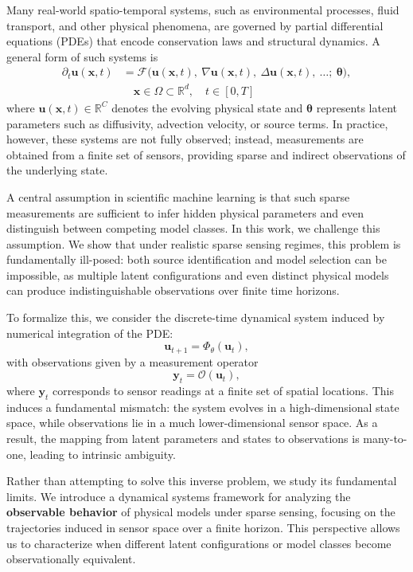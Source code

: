 Many real-world spatio-temporal systems, such as environmental processes, fluid transport, and other physical phenomena, are governed by partial differential equations (PDEs) that encode conservation laws and structural dynamics. A general form of such systems is 
\begin{align}
\partial_t \mathbf{u}(\mathbf{x}, t) 
&= \mathcal{F}\big(
    \mathbf{u}(\mathbf{x}, t),\ 
    \nabla \mathbf{u}(\mathbf{x}, t),\ 
    \Delta \mathbf{u}(\mathbf{x}, t),\ 
    \ldots;\ 
    \boldsymbol{\theta} 
\big), \nonumber \\
&\quad \mathbf{x} \in \Omega \subset \mathbb{R}^d,\quad t \in [0, T]
\end{align}
where \( \mathbf{u}(\mathbf{x}, t) \in \mathbb{R}^C \) denotes the evolving physical state and \( \boldsymbol{\theta} \) represents latent parameters such as diffusivity, advection velocity, or source terms. In practice, however, these systems are not fully observed; instead, measurements are obtained from a finite set of sensors, providing sparse and indirect observations of the underlying state.

A central assumption in scientific machine learning is that such sparse measurements are sufficient to infer hidden physical parameters and even distinguish between competing model classes. In this work, we challenge this assumption. We show that under realistic sparse sensing regimes, this problem is fundamentally ill-posed: both source identification and model selection can be impossible, as multiple latent configurations and even distinct physical models can produce indistinguishable observations over finite time horizons.

To formalize this, we consider the discrete-time dynamical system induced by numerical integration of the PDE:
\[
\mathbf{u}_{t+1} = \Phi_\theta(\mathbf{u}_t),
\]
with observations given by a measurement operator
\[
\mathbf{y}_t = \mathcal{O}(\mathbf{u}_t),
\]
where $\mathbf{y}_t$ corresponds to sensor readings at a finite set of spatial locations. This induces a fundamental mismatch: the system evolves in a high-dimensional state space, while observations lie in a much lower-dimensional sensor space. As a result, the mapping from latent parameters and states to observations is many-to-one, leading to intrinsic ambiguity.

Rather than attempting to solve this inverse problem, we study its fundamental limits. We introduce a dynamical systems framework for analyzing the \textbf{observable behavior} of physical models under sparse sensing, focusing on the trajectories induced in sensor space over a finite horizon. This perspective allows us to characterize when different latent configurations or model classes become observationally equivalent.

